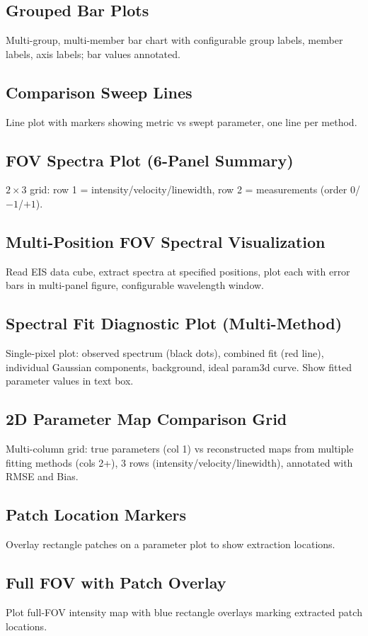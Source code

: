 \documentclass[11pt,a4paper]{article}
\begin{document}
\subsection{Grouped Bar Plots}
Multi-group, multi-member bar chart with configurable group labels, member labels, axis labels; bar values annotated.

\subsection{Comparison Sweep Lines}
Line plot with markers showing metric vs swept parameter, one line per method.

\subsection{FOV Spectra Plot (6-Panel Summary)}
$2{\times}3$ grid: row 1 = intensity/velocity/linewidth, row 2 = measurements (order $0$/$-1$/$+1$).

\subsection{Multi-Position FOV Spectral Visualization}
Read EIS data cube, extract spectra at specified positions, plot each with error bars in multi-panel figure, configurable wavelength window.

\subsection{Spectral Fit Diagnostic Plot (Multi-Method)}
Single-pixel plot: observed spectrum (black dots), combined fit (red line), individual Gaussian components, background, ideal param3d curve. Show fitted parameter values in text box.

\subsection{2D Parameter Map Comparison Grid}
Multi-column grid: true parameters (col 1) vs reconstructed maps from multiple fitting methods (cols 2+), 3 rows (intensity/velocity/linewidth), annotated with RMSE and Bias.

\subsection{Patch Location Markers}
Overlay rectangle patches on a parameter plot to show extraction locations.

\subsection{Full FOV with Patch Overlay}
Plot full-FOV intensity map with blue rectangle overlays marking extracted patch locations.
\end{document}
